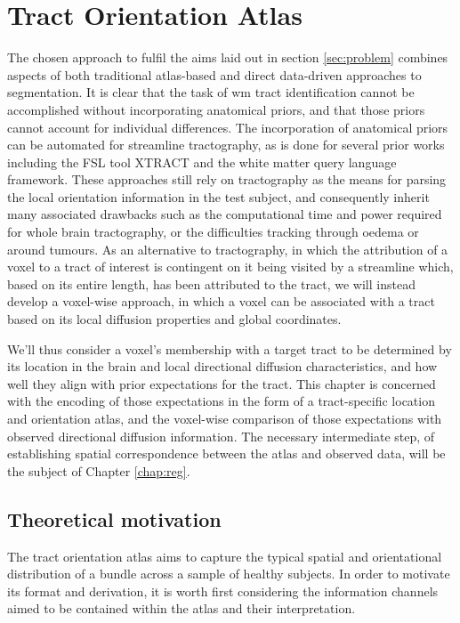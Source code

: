 \chapter{Tract Orientation Atlas}
\label{chap:atlas}


The chosen approach to fulfil the aims laid out in section \ref{sec:problem} combines aspects of both traditional atlas-based and direct data-driven approaches to segmentation.
It is clear that the task of \gls{wm} tract identification cannot be accomplished without incorporating anatomical priors, and that those priors cannot account for individual differences.
The incorporation of anatomical priors can be automated for streamline tractography, as is done for several prior works including the FSL tool XTRACT\autocite{Warrington2020} and the white matter query language framework.\autocite{Wassermann2016}
These approaches still rely on tractography as the means for parsing the local orientation information in the test subject, and consequently inherit many associated drawbacks such as the computational time and power required for whole brain tractography, or the difficulties tracking through oedema or around tumours.
As an alternative to tractography, in which the attribution of a voxel to a tract of interest is contingent on it being visited by a streamline which, based on its entire length, has been attributed to the tract, we will instead develop a voxel-wise approach, in which a voxel can be associated with a tract based on its local diffusion properties and global coordinates.

We'll thus consider a voxel's membership with a target tract to be determined by its location in the brain and local directional diffusion characteristics, and how well they align with prior expectations for the tract.
This chapter is concerned with the encoding of those expectations in the form of a tract-specific location and orientation atlas, and the voxel-wise comparison of those expectations with observed directional diffusion information.
The necessary intermediate step, of establishing spatial correspondence between the atlas and observed data, will be the subject of Chapter \ref{chap:reg}.

\section{Theoretical motivation}

The tract orientation atlas aims to capture the typical spatial and orientational distribution of a bundle across a sample of healthy subjects.
In order to motivate its format and derivation, it is worth first considering the information channels aimed to be contained within the atlas and their interpretation.

